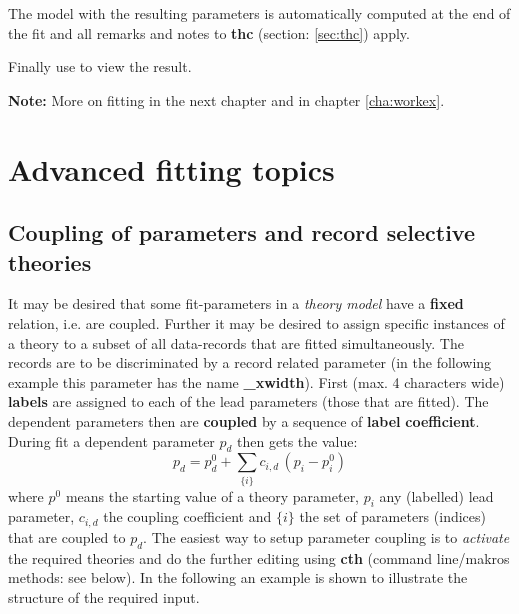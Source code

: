\documentclass[11pt,fleqn]{book} %
\newcommand{\linespace}{\vspace{4ex}}
\newcommand{\cmdl}[2]{{\color{red}{\bf \underline{#1} #2}}}
\begin{document}
The model with the resulting parameters is automatically computed at the end of the fit and all remarks 
and notes to {\bf thc} (section: \ref{sec:thc}) apply.
\linespace

Finally use \cmdl{plot}{} to view the result.


{\bf Note:} More on fitting in the next chapter and in chapter \ref{cha:workex}.
\chapter{Advanced fitting topics}
\label{cha:advfit}

\section{Coupling of parameters and record selective theories}
\label{sec:coupling}
It may be desired that some fit-parameters in a \emph{theory model} have a {\bf fixed} relation,
i.e. are coupled. Further it may be desired to assign specific instances of a theory to
a subset of all data-records that are fitted simultaneously. The records are to be discriminated
by a record related parameter (in the following example this parameter has the name {\bf \_xwidth}).
\linespace
First (max. 4 characters wide) {\bf labels} are assigned to each of the lead parameters 
(those that are fitted). The dependent parameters then are {\bf coupled} by a sequence of
{\bf label} {\bf coefficient}. During fit a dependent parameter ${p_d}$ then gets the value:
\begin{equation}
\label{eq:X}
p_d = p_d^0 + \sum_{\{i\}}{c_{i,d} \, (p_i-p_i^0)}
\end{equation}  
where ${p^0}$ means the starting value of a theory parameter, ${p_i}$ any (labelled) lead parameter,
${c_{i,d}}$ the coupling coefficient and ${\{i\}}$ the set of parameters (indices) that are coupled to
${p_d}$.
\linespace
The easiest way to setup parameter coupling is to \emph{activate} the required theories
and do the further editing using {\bf cth}  (command line/makros methods: see below).
In the following an example is shown to illustrate the structure of the required input.
\small
\end{document}
